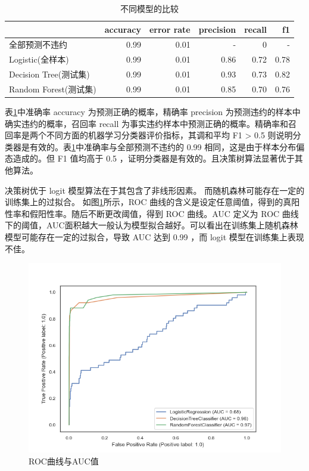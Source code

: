 \begin{table}
	\caption{\label{tab:acc}不同模型的比较}
	\centering
	\begin{tabular}{lrrrrr}
		                      & accuracy & error rate & precision & recall & f1   \\
		\hline
		全部预测不违约        & 0.99     & 0.01       & -         & 0      & -    \\
		Logistic(全样本)      & 0.99     & 0.01       & 0.86      & 0.72   & 0.78 \\
		Decision Tree(测试集) & 0.99     & 0.01       & 0.93      & 0.73   & 0.82 \\
		Random Forest(测试集) & 0.99     & 0.01       & 0.85      & 0.70   & 0.76 \\
	\end{tabular}
\end{table}

表\ref{tab:acc}中准确率 accuracy 为预测正确的概率，精确率 precision 为预测违约的样本中确实违约的概率，召回率 recall 为事实违约样本中预测正确的概率。精确率和召回率是两个不同方面的机器学习分类器评价指标，其调和平均 F1 > 0.5 则说明分类器是有效的。表\ref{tab:acc}中准确率与全部预测不违约的 0.99 相同，这是由于样本分布偏态造成的。但 F1 值均高于 0.5 ，证明分类器是有效的。且决策树算法显著优于其他算法。

决策树优于 logit 模型算法在于其包含了非线形因素。
而随机森林可能存在一定的训练集上的过拟合。
如图\ref{fig:roc}所示，ROC 曲线的含义是设定任意阈值，得到的真阳性率和假阳性率。随后不断更改阈值，得到 ROC 曲线。AUC 定义为 ROC 曲线下的阈值，AUC面积越大一般认为模型拟合越好。可以看出在训练集上随机森林模型可能存在一定的过拟合，导致 AUC 达到 0.99 ，而 logit 模型在训练集上表现不佳。
\begin{figure}[htbp]
	\centering
	\includegraphics[width=.9\linewidth]{./data/roc.png}
	\caption{\label{fig:roc}ROC曲线与AUC值}
\end{figure}

